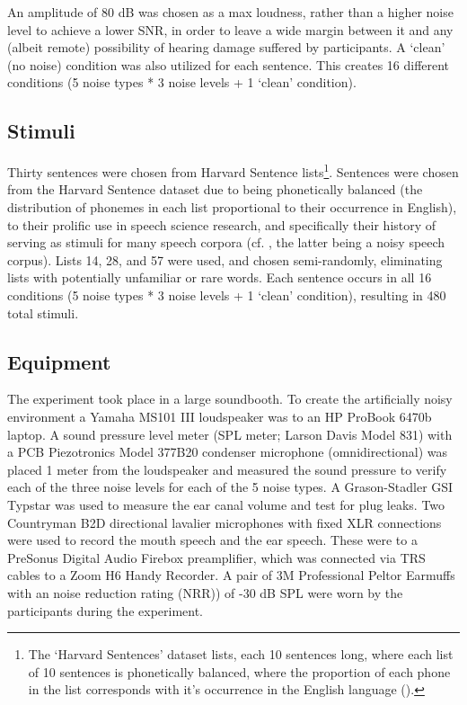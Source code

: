 An amplitude of 80 dB was chosen as a max loudness, rather than a higher noise level to achieve a lower SNR, in order to leave a wide margin between it and any (albeit remote) possibility of hearing damage suffered by participants.  A `clean' (no noise) condition was also utilized for each sentence.  This creates 16 different conditions (5 noise types * 3 noise levels + 1 `clean' condition).  

\subsection{Stimuli}
Thirty sentences were chosen from \DIFdelbegin {}\DIFdelend \DIFaddbegin {}\DIFaddend Harvard Sentence lists\footnote{The `Harvard Sentences' dataset \DIFdelbegin {}\DIFdelend \DIFaddbegin {} lists, each 10 sentences long, where each list of 10 sentences is phonetically balanced, where the proportion of each phone in the list corresponds with it's occurrence in the English language (\cite{harvardSents}).}.  Sentences were chosen from the Harvard Sentence dataset due to being phonetically balanced (the distribution of phonemes in each list proportional to their occurrence in English), to their prolific use in speech science research, and specifically their history of serving as stimuli for many speech corpora (cf. \cite{kabal:02,hu:07}, the latter being a noisy speech corpus).  Lists 14, 28, and 57 were used, and chosen semi-randomly, eliminating lists with potentially unfamiliar or rare words.  Each sentence occurs in all 16 conditions (5 noise types * 3 noise levels + 1 `clean' condition), resulting in 480 total stimuli.

  
\subsection{Equipment}

The experiment took place in a large soundbooth.  To create the artificially noisy environment a Yamaha MS101 III loudspeaker was \DIFdelbegin {}\DIFdelend \DIFaddbegin {}\DIFaddend to an HP ProBook 6470b laptop.  A sound pressure level meter (SPL meter; Larson Davis Model 831) with a PCB Piezotronics Model 377B20 condenser microphone (omnidirectional) was placed 1 meter from the loudspeaker and measured the sound pressure to verify each of the three noise levels for each of the 5 noise types. A Grason-Stadler GSI Typstar \DIFdelbegin {}\DIFdelend \DIFaddbegin {}\DIFaddend was used to measure the ear canal volume and test for plug leaks.  Two Countryman B2D directional lavalier microphones with fixed XLR connections were used to record the mouth speech and the ear speech.  These were \DIFdelbegin {}\DIFdelend \DIFaddbegin {}\DIFaddend to a PreSonus Digital Audio Firebox preamplifier, which was connected via TRS cables to a Zoom H6 Handy Recorder. A pair of 3M Professional Peltor Earmuffs with an noise reduction rating (NRR)) of -30 dB SPL were worn by the participants during the experiment.


